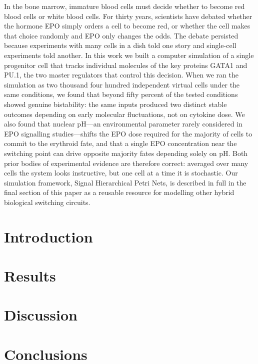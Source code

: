 \documentclass[10pt,letterpaper]{article}
\begin{document}
In the bone marrow, immature blood cells must decide whether to become red
blood cells or white blood cells. For thirty years, scientists have debated
whether the hormone EPO simply orders a cell to become red, or whether the
cell makes that choice randomly and EPO only changes the odds. The debate
persisted because experiments with many cells in a dish told one story and
single-cell experiments told another. In this work we built a computer
simulation of a single progenitor cell that tracks individual molecules of
the key proteins GATA1 and PU.1, the two master regulators that control this
decision. When we ran the simulation as two thousand four hundred independent
virtual cells under the same conditions, we found that beyond fifty percent of
the tested conditions showed genuine bistability: the same inputs produced two
distinct stable outcomes depending on early molecular fluctuations, not on
cytokine dose. We also found that nuclear pH---an environmental parameter
rarely considered in EPO signalling studies---shifts the EPO dose required for
the majority of cells to commit to the erythroid fate, and that a single EPO
concentration near the switching point can drive opposite majority fates
depending solely on pH. Both prior bodies of experimental evidence are therefore
correct: averaged over many cells the system looks instructive, but one cell at
a time it is stochastic. Our simulation framework, Signal Hierarchical Petri
Nets, is described in full in the final section of this paper as a reusable
resource for modelling other hybrid biological switching circuits.

\section{Introduction}
\label{sec:intro}


\section{Results}
\label{sec:results}


\section{Discussion}
\label{sec:discussion}


\section{Conclusions}
\label{sec:conclusions}

\end{document}

